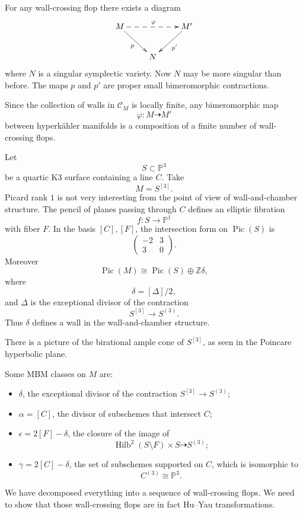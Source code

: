 For any wall-crossing flop there
exists a diagram
\[
\xymatrix{
M \ar@{-->}[rr]^{\varphi}
\ar[dr]_{p}
&&
M' \ar[dl]^{p'}
\\
& N &
}
\]
where $N$ is a singular symplectic
variety.
Now $N$ may be more singular than
before.
The maps $p$ and $p'$ are proper small
bimeromorphic contractions.

Since the collection of walls in
$\mathcal C_M$ is locally finite, any
bimeromorphic map
\[
\varphi:M\dashrightarrow M'
\]
between hyperk\"ahler manifolds is a
composition of a finite number of
wall-crossing flops.

\begin{example}
\label{example-let-s3}
Let
\[
S\subset \mathbb{P}^3
\]
be a quartic K3 surface containing a
line $C$.
Take
\[
M=S^{[3]}.
\]
Picard rank $1$ is not very
interesting from the point of view of
wall-and-chamber structure.
The pencil of planes passing through
$C$ defines an elliptic fibration
\[
f:S\to \mathbb{P}^1
\]
with fiber $F$.
In the basis $[C],[F]$, the
intersection form on $\operatorname{Pic}
(S)$ is
\[
\begin{pmatrix}
-2 & 3\\
3 & 0
\end{pmatrix}.
\]
Moreover
\[
\operatorname{Pic}(M)
\cong
\operatorname{Pic}(S)\oplus\mathbb{Z}\delta,
\]
where
\[
\delta=[\Delta]/2,
\]
and $\Delta$ is the exceptional
divisor of the contraction
\[
S^{[3]}\to S^{(3)}.
\]
Thus $\delta$ defines a wall in the
wall-and-chamber structure.
\end{example}

There is a picture of the birational
ample cone of $S^{[3]}$, as seen in
the Poincare hyperbolic plane.

Some MBM classes on $M$ are:
\begin{itemize}
\item $\delta$, the exceptional
divisor of the contraction
$S^{[3]}\to S^{(3)}$;
\item $\alpha=[C]$, the divisor of
subschemes that intersect $C$;
\item $\epsilon=2[F]-\delta$, the
closure of the image of
\[
\operatorname{Hilb}^2(S\setminus F)
\times S
\dashrightarrow
S^{(3)};
\]
\item $\gamma=2[C]-\delta$, the set
of subschemes supported on $C$, which
is isomorphic to
\[
C^{(3)}\cong \mathbb{P}^3.
\]
\end{itemize}

We have decomposed everything into a
sequence of wall-crossing flops.
We need to show that those
wall-crossing flops are in fact
Hu--Yau transformations.


